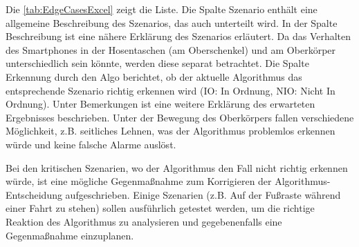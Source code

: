 Die \autoref{tab:EdgeCasesExcel} zeigt die Liste. Die Spalte \glqq Szenario\grqq{} enthält eine allgemeine Beschreibung des Szenarios, das auch unterteilt wird. In der Spalte \glqq Beschreibung\grqq{} ist eine nähere Erklärung des Szenarios erläutert.
Da das Verhalten des Smartphones in der Hosentaschen (am Oberschenkel) und am Oberkörper unterschiedlich sein könnte, werden diese separat betrachtet.
Die Spalte \glqq Erkennung durch den Algo\grqq{} berichtet, ob der aktuelle Algorithmus das entsprechende Szenario richtig erkennen wird (IO: In Ordnung, NIO: Nicht In Ordnung). Unter \glqq Bemerkungen\grqq{} ist eine weitere Erklärung des erwarteten Ergebnisses beschrieben. 
Unter der Bewegung des Oberkörpers fallen verschiedene Möglichkeit, z.B. seitliches Lehnen, was der Algorithmus problemlos erkennen würde und keine falsche Alarme auslöst.

Bei den kritischen Szenarien, wo der Algorithmus den Fall nicht richtig erkennen würde, ist eine mögliche Gegenmaßnahme zum Korrigieren der Algo\-rithmus-Ent\-scheid\-ung aufgeschrieben.
Einige Szenarien (z.B. Auf der Fußraste während einer Fahrt zu stehen) sollen ausführlich getestet werden, um die richtige Reaktion des Algorithmus zu analysieren und gegebenenfalls eine Gegenmaßnahme einzuplanen.

